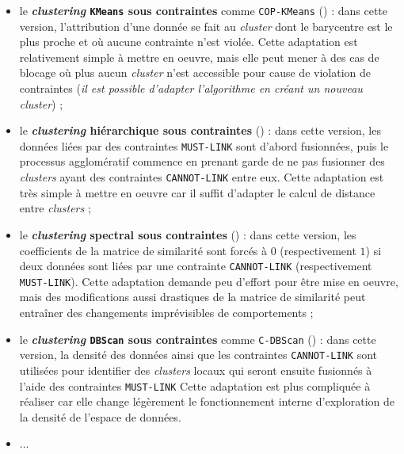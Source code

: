 		\begin{itemize}
			\item le \textbf{\textit{clustering} \texttt{KMeans} sous contraintes} comme \texttt{COP-KMeans} (\cite{wagstaff-etal:2001:constrained-kmeans-clustering}) :
			dans cette version, l'attribution d'une donnée se fait au \textit{cluster} dont le barycentre est le plus proche et où aucune contrainte n'est violée.
			Cette adaptation est relativement simple à mettre en oeuvre, mais elle peut mener à des cas de blocage où plus aucun \textit{cluster} n'est accessible pour cause de violation de contraintes (\textit{il est possible d'adapter l'algorithme en créant un nouveau \textit{cluster}}) ;
			\item le \textbf{\textit{clustering} hiérarchique sous contraintes} (\cite{davidson-ravi:2005:agglomerative-hierarchical-clustering}) :
			dans cette version, les données liées par des contraintes \texttt{MUST-LINK} sont d'abord fusionnées, puis le processus agglomératif commence en prenant garde de ne pas fusionner des \textit{clusters} ayant des contraintes \texttt{CANNOT-LINK} entre eux.
			Cette adaptation est très simple à mettre en oeuvre car il suffit d'adapter le calcul de distance entre \textit{clusters} ;
			\item le \textbf{\textit{clustering} spectral sous contraintes} (\cite{kamvar-etal:2003:spectral-learning}) :
			dans cette version, les coefficients de la matrice de similarité sont forcés à $0$ (respectivement $1$) si deux données sont liées par une contrainte \texttt{CANNOT-LINK} (respectivement \texttt{MUST-LINK}).
			Cette adaptation demande peu d'effort pour être mise en oeuvre, mais des modifications aussi drastiques de la matrice de similarité peut entraîner des changements imprévisibles de comportements ;
			\item le \textbf{\textit{clustering} \texttt{DBScan} sous contraintes} comme \texttt{C-DBScan} (\cite{ruiz-etal:2010:densitybased-semisupervised-clustering}) :
			dans cette version, la densité des données ainsi que les contraintes \texttt{CANNOT-LINK} sont utilisées pour identifier des \textit{clusters} locaux qui seront ensuite fusionnés à l'aide des contraintes \texttt{MUST-LINK}
			Cette adaptation est plus compliquée à réaliser car elle change légèrement le fonctionnement interne d'exploration de la densité de l'espace de données.
			\item ...
		\end{itemize}
		

